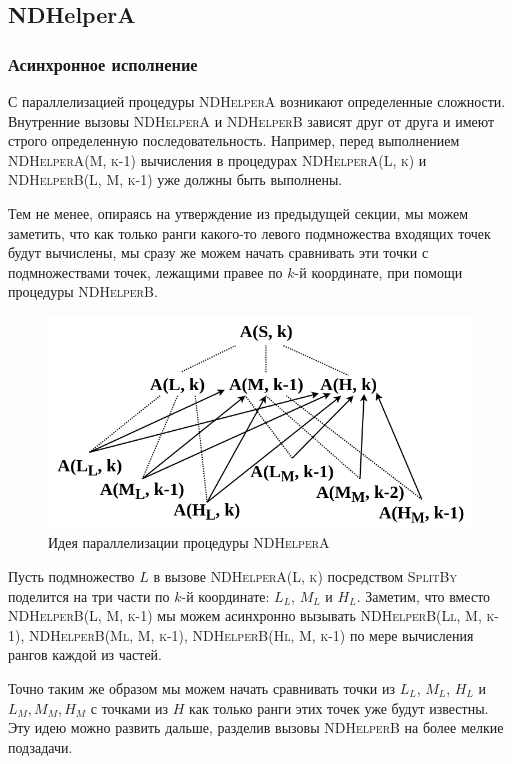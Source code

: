\subsection{NDHelperA}
\subsubsection{Асинхронное исполнение}
С параллелизацией процедуры \textsc{NDHelperA} возникают определенные сложности.
Внутренние вызовы \textsc{NDHelperA} и \textsc{NDHelperB} зависят друг от друга и имеют строго определенную последовательность. 
Например, перед выполнением \textsc{NDHelperA(M, k-1)} вычисления в процедурах \textsc{NDHelperA(L, k)} и \textsc{NDHelperB(L, M, k-1)} уже должны быть выполнены.

Тем не менее, опираясь на утверждение из предыдущей секции, мы можем заметить, что как только ранги какого-то левого подмножества входящих точек будут вычислены, мы сразу же можем начать сравнивать эти точки с подмножествами точек, лежащими правее по $k$-й координате, при помощи процедуры \textsc{NDHelperB}.

\begin{figure}[h]
\centering
\includegraphics[width=\textwidth]{images/async.png}
\caption{Идея параллелизации процедуры \textsc{NDHelperA}}
\end{figure}

Пусть подмножество $L$ в вызове \textsc{NDHelperA(L, k)} посредством \textsc{SplitBy} поделится на три части по $k$-й координате: $L_L$, $M_L$ и $H_L$.
Заметим, что вместо \textsc{NDHelperB(L, M, k-1)} мы можем асинхронно вызывать \textsc{NDHelperB(Ll, M, k-1)}, \textsc{NDHelperB(Ml, M, k-1)}, \textsc{NDHelperB(Hl, M, k-1)} по мере вычисления рангов каждой из частей.

Точно таким же образом мы можем начать сравнивать точки из $L_L$, $M_L$, $H_L$ и $L_M, M_M, H_M$ с точками из $H$ как только ранги этих точек уже будут известны.
Эту идею можно развить дальше, разделив вызовы \textsc{NDHelperB} на более мелкие подзадачи.

